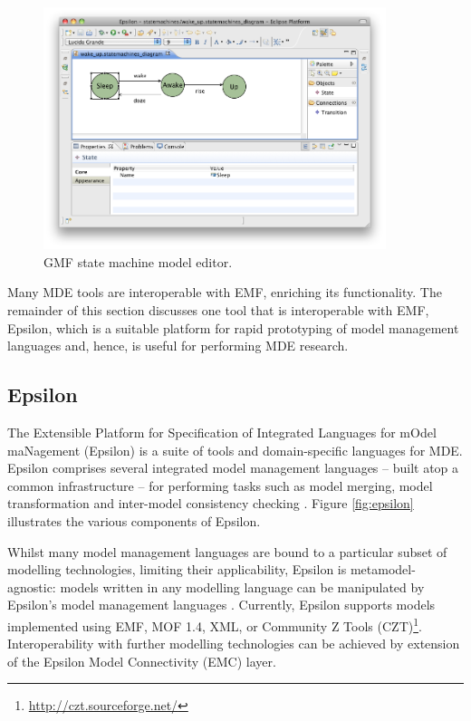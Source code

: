 \begin{figure}[htbp]
  \begin{center}
    \leavevmode
    \includegraphics[width=10cm]{2.Background/images/gmf_model_editor.png}
  \end{center}
  \caption{GMF state machine model editor.}
  \label{fig:gmf_model_editor}
\end{figure}

Many MDE tools are interoperable with EMF, enriching its functionality. The remainder of this section discusses one tool that is interoperable with EMF, Epsilon, which is a suitable platform for rapid prototyping of model management languages and, hence, is useful for performing MDE research.

\subsection{Epsilon}
\label{subsec:epsilon}
The Extensible Platform for Specification of Integrated Languages for mOdel maNagement (Epsilon) \cite{epsilon} is a suite of tools and domain-specific languages for MDE. Epsilon comprises several integrated model management languages -- built atop a common infrastructure -- for performing tasks such as model merging, model transformation and inter-model consistency checking \cite{kolovos09thesis}. Figure \ref{fig:epsilon} illustrates the various components of Epsilon.

Whilst many model management languages are bound to a particular subset of modelling technologies, limiting their applicability, Epsilon is metamodel-agnostic: models written in any modelling language can be manipulated by Epsilon's model management languages \cite{kolovos06eol}. Currently, Epsilon supports models implemented using EMF, MOF 1.4, XML, or Community Z Tools (CZT)\footnote{\url{http://czt.sourceforge.net/}}. Interoperability with further modelling technologies can be achieved by extension of the Epsilon Model Connectivity (EMC) layer. 

